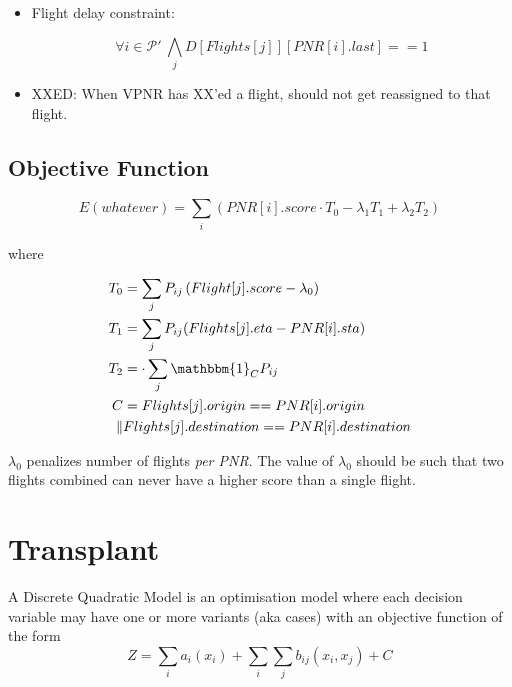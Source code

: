 \documentclass{article}
\providecommand{\brak}[1]{\ensuremath{\left(#1\right)}}
\providecommand{\sbrak}[1]{\ensuremath{\left[#1\right]}}
\begin{document}
\begin{flushleft}
\begin{itemize}
\begin{itemize}
\begin{itemize}
            This cannot be expressed as a constraint, so it will be added to the objective function we seek to \emph{maximize}, as a term \[\forall i,k,\ \lambda_c \sbrak{\sum_{x, y} P_{ix}::k \cdot P_{iy}::(k + 1) \cdot (F_{xy} - 1)}\]

            We need to provide a high \(\lambda_c\) to reduce likelihood of violation.

            \emph{Feature, not bug}: Sometimes, this may get violated if score is very high. This is good.
        \end{itemize}
    \end{itemize}

    \item Flight delay constraint: 

    \[\forall i \in \mathcal{P'}\ \bigwedge_j D[Flights[j]][PNR[i].last] == 1\]
    \item XXED: When VPNR has XX'ed a flight, should not get reassigned to that flight.
\end{itemize}

\subsection{Objective Function}

\[E\brak{whatever} = \sum_{i} \brak{ PNR[i].score \cdot T_0 - \lambda_1 T_1 + \lambda_2 T_2}\]

where

\begin{align*}
    T_0 &=  \sum_{j} P_{ij} \brak{Flight[j].score - \lambda_0} \\
    T_1 &= \sum_j P_{ij}(Flights[j].eta - PNR[i].sta) \\
    T_2 &= \cdot \sum_{j} \mathbbm{1}_{C} P_{ij} \\
    C &= Flights[j].origin == PNR[i].origin \\\|& Flights[j].destination == PNR[i].destination
\end{align*}

\(\lambda_0\) penalizes number of flights \textit{per PNR}. The value of \(\lambda_0\) should be such that two flights combined can never have a higher score than a single flight.


\section{Transplant}

A Discrete Quadratic Model is an optimisation model where each decision variable may have one or more variants (aka cases) with an objective function of the form 
\[Z = \sum_{i} a_i(x_i) + \sum_{i} \sum_{j} b_{ij} (x_i, x_j) + C\]


\end{flushleft}
\end{document}
